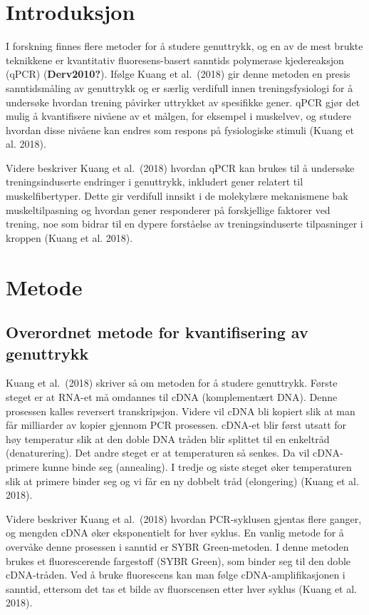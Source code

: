 \documentclass[
  letterpaper,
  DIV=11,
  numbers=noendperiod]{scrreprt}
\begin{document}
\section{Introduksjon}\label{introduksjon-5}

I forskning finnes flere metoder for å studere genuttrykk, og en av de
mest brukte teknikkene er kvantitativ fluoresens-basert sanntids
polymerase kjedereaksjon (qPCR) (\textbf{Derv2010?}). Ifølge Kuang et
al.~(2018) gir denne metoden en presis sanntidsmåling av genuttrykk og
er særlig verdifull innen treningsfysiologi for å undersøke hvordan
trening påvirker uttrykket av spesifikke gener. qPCR gjør det mulig å
kvantifisere nivåene av et målgen, for eksempel i muskelvev, og studere
hvordan disse nivåene kan endres som respons på fysiologiske stimuli
(Kuang et al. 2018).

Videre beskriver Kuang et al.~(2018) hvordan qPCR kan brukes til å
undersøke treningsinduserte endringer i genuttrykk, inkludert gener
relatert til muskelfibertyper. Dette gir verdifull innsikt i de
molekylære mekanismene bak muskeltilpasning og hvordan gener responderer
på forskjellige faktorer ved trening, noe som bidrar til en dypere
forståelse av treningsinduserte tilpasninger i kroppen (Kuang et al.
2018).

\section{Metode}\label{metode-5}

\subsection{Overordnet metode for kvantifisering av
genuttrykk}\label{overordnet-metode-for-kvantifisering-av-genuttrykk}

Kuang et al.~(2018) skriver så om metoden for å studere genuttrykk.
Første steget er at RNA-et må omdannes til cDNA (komplementært DNA).
Denne prosessen kalles reversert transkripsjon. Videre vil cDNA bli
kopiert slik at man får milliarder av kopier gjennom PCR prosessen.
cDNA-et blir først utsatt for høy temperatur slik at den doble DNA
tråden blir splittet til en enkeltråd (denaturering). Det andre steget
er at temperaturen så senkes. Da vil cDNA-primere kunne binde seg
(annealing). I tredje og siste steget øker temperaturen slik at primere
binder seg og vi får en ny dobbelt tråd (elongering) (Kuang et al.
2018).

Videre beskriver Kuang et al.~(2018) hvordan PCR-syklusen gjentas flere
ganger, og mengden cDNA øker eksponentielt for hver syklus. En vanlig
metode for å overvåke denne prosessen i sanntid er SYBR Green-metoden. I
denne metoden brukes et fluorescerende fargestoff (SYBR Green), som
binder seg til den doble cDNA-tråden. Ved å bruke fluorescens kan man
følge cDNA-amplifikasjonen i sanntid, ettersom det tas et bilde av
fluorscensen etter hver syklus (Kuang et al. 2018).
\end{document}
